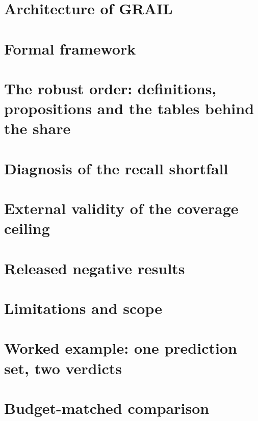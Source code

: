 \documentclass{article}
\begin{document}


\section{Architecture of GRAIL}
\label{app:arch}


\section{Formal framework}
\label{app:formal}


\section{The robust order: definitions, propositions and the tables behind the share}
\label{app:robust}


\section{Diagnosis of the recall shortfall}
\label{app:props}


\section{External validity of the coverage ceiling}
\label{app:external}


\section{Released negative results}
\label{app:negative}


\section{Limitations and scope}
\label{app:xdomain}


\section{Worked example: one prediction set, two verdicts}
\label{app:worked}


\section{Budget-matched comparison}
\label{app:budget}

\end{document}
